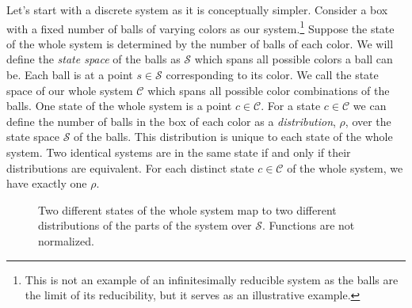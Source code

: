 \documentclass{article}[a4paper]
\begin{document}
	Let's start with a discrete system as it is conceptually simpler. Consider a box with a fixed number of balls of varying colors as our system.\footnote{This is not an example of an infinitesimally reducible system as the balls are the limit of its reducibility, but it serves as an illustrative example.} Suppose the state of the whole system is determined by the number of balls of each color. We will define the \textit{state space} of the balls as $\mathcal{S}$ which spans all possible colors a ball can be. Each ball is at a point $s \in \mathcal{S}$ corresponding to its color. We call the state space of our whole system $\mathcal{C}$ which spans all possible color combinations of the balls. One state of the whole system is a point $c \in \mathcal{C}$. For a state $c \in \mathcal{C}$ we can define the number of balls in the box of each color as a \textit{distribution}, $\rho$, over the state space $\mathcal{S}$ of the balls. This distribution is unique to each state of the whole system. Two identical systems are in the same state if and only if their distributions are equivalent. For each distinct state $c \in \mathcal{C}$ of the whole system, we have exactly one $\rho$. 


\begin{figure}
\begin{center}
\end{center}
\caption{Two different states of the whole system map to two different distributions of the parts of the system over $\mathcal{S}$. Functions are not normalized.}
\end{figure}
	
\end{document}
